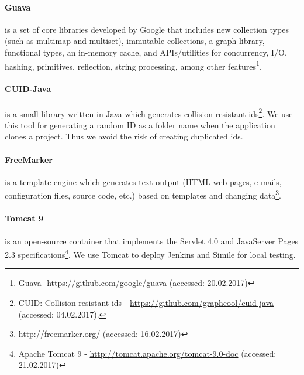\paragraph{Guava}
is a set of core libraries developed by Google that includes new collection types (such as multimap and multiset), immutable collections, a graph library, functional types, an in-memory cache, and APIs/utilities for concurrency, I/O, hashing, primitives, reflection, string processing, among other features\footnote{Guava -\url{https://github.com/google/guava} (accessed: 20.02.2017)}.
\paragraph{CUID-Java}
is a small library written in Java which generates collision-resistant ids\footnote{CUID: Collision-resistant ids - \url{https://github.com/graphcool/cuid-java} (accessed: 04.02.2017).}. We use this tool for generating a random ID as a folder name when the application clones a project. Thus we avoid the risk of creating duplicated ids.
\paragraph{FreeMarker}
is a template engine which generates text output (HTML web pages, e-mails, configuration files, source code, etc.) based on templates and changing data\footnote{\url{http://freemarker.org/} (accessed: 16.02.2017)}. 
\paragraph{Tomcat 9}
is an open-source container that implements the Servlet 4.0 and JavaServer Pages 2.3 specifications\footnote{Apache Tomcat 9 - \url{http://tomcat.apache.org/tomcat-9.0-doc} (accessed: 21.02.2017)}. We use Tomcat to deploy Jenkins and Simile for local testing.
